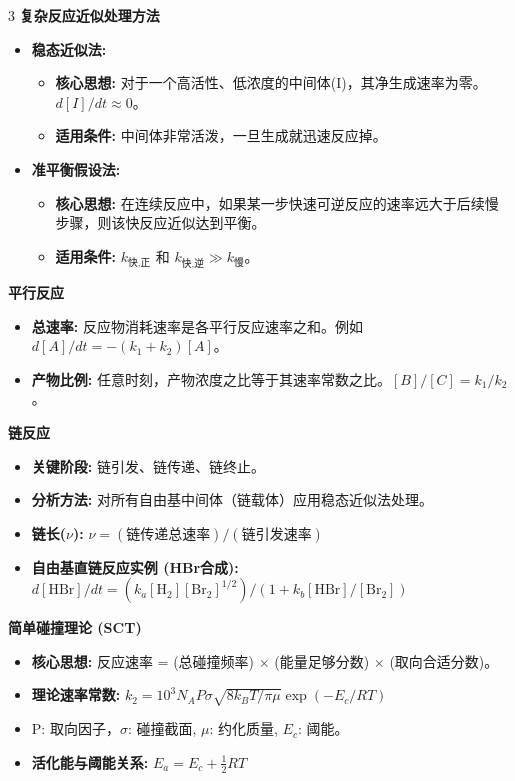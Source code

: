 \documentclass[a4paper,6pt]{article} %
\begin{document}
\begin{multicols}{3}
\textbf{复杂反应近似处理方法}
\begin{itemize}
    \item \textbf{稳态近似法:}
    \begin{itemize}
        \item \textbf{核心思想:} 对于一个高活性、低浓度的中间体(I)，其净生成速率为零。$d[I]/dt \approx 0$。
        \item \textbf{适用条件:} 中间体非常活泼，一旦生成就迅速反应掉。
    \end{itemize}
    \item \textbf{准平衡假设法:}
    \begin{itemize}
        \item \textbf{核心思想:} 在连续反应中，如果某一步快速可逆反应的速率远大于后续慢步骤，则该快反应近似达到平衡。
        \item \textbf{适用条件:} $k_{\text{快,正}}$ 和 $k_{\text{快,逆}} \gg k_{\text{慢}}$。
    \end{itemize}
\end{itemize}

\textbf{平行反应}
\begin{itemize}
    \item \textbf{总速率:} 反应物消耗速率是各平行反应速率之和。例如 $d[A]/dt = - (k_1 + k_2)[A]$。
    \item \textbf{产物比例:} 任意时刻，产物浓度之比等于其速率常数之比。$[B] / [C] = k_1 / k_2$。
\end{itemize}

\textbf{链反应}
\begin{itemize}
    \item \textbf{关键阶段:} 链引发、链传递、链终止。
    \item \textbf{分析方法:} 对所有自由基中间体（链载体）应用稳态近似法处理。
    \item \textbf{链长($\nu$):} $\nu = (\text{链传递总速率}) / (\text{链引发速率})$
    \item \textbf{自由基直链反应实例 (HBr合成):} $d[\text{HBr}]/dt = (k_a[\text{H}_2][\text{Br}_2]^{1/2}) / (1 + k_b[\text{HBr}]/[\text{Br}_2])$
\end{itemize}

\textbf{简单碰撞理论 (SCT)}
\begin{itemize}
    \item \textbf{核心思想:} 反应速率 = (总碰撞频率) $\times$ (能量足够分数) $\times$ (取向合适分数)。
    \item \textbf{理论速率常数:} $k_2 = 10^3 N_A P \sigma \sqrt{8k_B T/\pi\mu} \exp(-E_c/RT)$
    \item P: 取向因子，$\sigma$: 碰撞截面, $\mu$: 约化质量, $E_c$: 阈能。
    \item \textbf{活化能与阈能关系:} $E_a = E_c + \frac{1}{2}RT$
\end{itemize}


\end{multicols}
\end{document}
